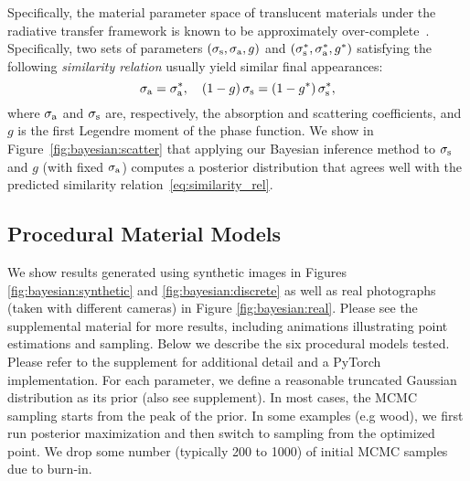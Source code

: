 

Specifically, the material parameter space of translucent materials under the radiative transfer framework \cite{chandrasekhar1960radiative} is known to be approximately over-complete~\cite{zhao2014high}.
Specifically, two sets of parameters $(\sigma_\mathrm{s}, \sigma_\mathrm{a}, g)$ and $(\sigma_\mathrm{s}^*, \sigma_\mathrm{a}^*, g^*)$ satisfying the following \emph{similarity relation} usually yield similar final appearances:
\begin{equation}
	\label{eq:similarity_rel}
	\sigma_\mathrm{a} = \sigma_\mathrm{a}^*, \quad (1 - g)\,\sigma_\mathrm{s} = (1 - g^*)\,\sigma_\mathrm{s}^*,
\end{equation}
where $\sigma_\mathrm{a}$ and $\sigma_\mathrm{s}$ are, respectively, the absorption and scattering coefficients, and $g$ is the first Legendre moment of the phase function.
We show in Figure~\ref{fig:bayesian:scatter} that applying our Bayesian inference method to $\sigma_\mathrm{s}$ and $g$ (with fixed $\sigma_\mathrm{a}$) computes a posterior distribution that agrees well with the predicted similarity relation~\eqref{eq:similarity_rel}.


\subsection{Procedural Material Models}
\label{ssec:proc_models}

We show results generated using synthetic images in Figures \ref{fig:bayesian:synthetic} and \ref{fig:bayesian:discrete} as well as real photographs (taken with different cameras) in Figure \ref{fig:bayesian:real}.
Please see the supplemental material for more results, including animations illustrating point estimations and sampling. Below we describe the six procedural models tested. Please refer to the supplement for additional detail and a \textsf{PyTorch} implementation. For each parameter, we define a reasonable truncated Gaussian distribution as its prior (also see supplement). In most cases, the MCMC sampling starts from the peak of the prior. In some examples (e.g wood), we first run posterior maximization and then switch to sampling from the optimized point. We drop some number (typically 200 to 1000) of initial MCMC samples due to burn-in.









